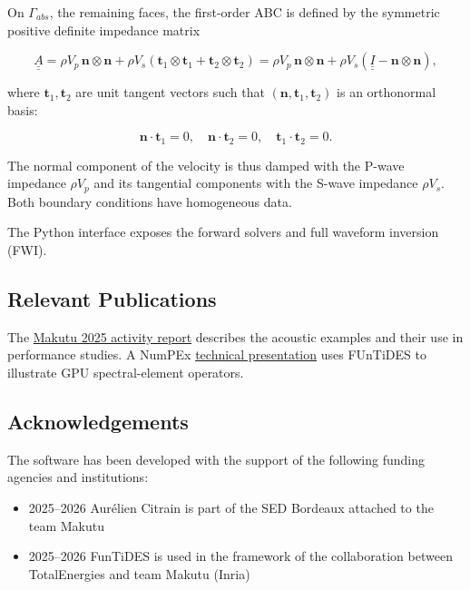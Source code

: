 On $\Gamma_{abs}$, the remaining faces, the first-order ABC is defined by the symmetric positive definite impedance matrix 

\begin{equation}
  \underline{\underline{A}} = \rho V_p\, \mathbf{n} \otimes \mathbf{n}
  + \rho V_s \left( \mathbf{t}_1 \otimes \mathbf{t}_1 + \mathbf{t}_2 \otimes \mathbf{t}_2 \right)
  = \rho V_p\, \mathbf{n} \otimes \mathbf{n} + \rho V_s \left( \underline{\underline{I}} - \mathbf{n} \otimes \mathbf{n} \right),
\end{equation}

where $\mathbf{t}_1, \mathbf{t}_2$ are unit tangent vectors such that $(\mathbf{n}, \mathbf{t}_1, \mathbf{t}_2)$
is an orthonormal basis: 

\begin{equation}
  \mathbf{n} \cdot \mathbf{t}_1 = 0, \quad \mathbf{n} \cdot \mathbf{t}_2 = 0, \quad \mathbf{t}_1 \cdot \mathbf{t}_2 = 0.
\end{equation}

The normal component of the velocity is thus damped with the P-wave impedance $\rho V_p$ and its tangential components with the S-wave 
impedance $\rho V_s$.
Both boundary conditions have homogeneous data.

The Python interface exposes the forward solvers and full waveform inversion (FWI).


\subsection{Relevant Publications}
\label{sec:FUnTiDES:publications}

The \href{https://radar.inria.fr/report/2025/makutu/index.html}{Makutu
2025 activity report} describes the acoustic examples and their use in
performance studies. A NumPEx \href{https://numpex.org/wp-content/uploads/sites/6/2026/03/High-Performance-Spectral-Element-Operators-on-GPUs-.pdf}{technical presentation}
uses FUnTiDES to illustrate GPU spectral-element operators.

\subsection{Acknowledgements}
\label{sec:FUnTiDES:acknowledgements}
The software has been developed with the support of the following funding agencies and institutions:

\begin{itemize}
  \item 2025--2026 Aurélien Citrain is part of the SED Bordeaux attached to the team Makutu
  \item 2025--2026 FunTiDES is used in the framework of the collaboration between TotalEnergies and team Makutu (Inria)
\end{itemize}
